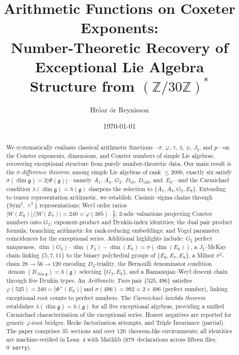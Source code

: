 \documentclass[11pt]{amsart}
\title[Arithmetic Functions on Coxeter Exponents]%
{Arithmetic Functions on Coxeter Exponents:\\
Number-Theoretic Recovery of Exceptional Lie Algebra\\
Structure from $(\mathbb{Z}/30\mathbb{Z})^*$}
\author{Hr\'{o}ar \TH\'{o}r Reynisson}
\date{\today}
\theoremstyle{plain}
\theoremstyle{definition}
\theoremstyle{remark}
\newcommand{\fg}{\mathfrak{g}}
\renewcommand{\Phi}{\varPhi}
\newcommand{\denom}{\operatorname{denom}}
\begin{document}
\begin{abstract}
We systematically evaluate classical arithmetic functions---$\sigma$,
$\varphi$, $\tau$, $\lambda$, $\psi$, $J_2$, and $p$---on the Coxeter
exponents, dimensions, and Coxeter numbers of simple Lie algebras,
recovering exceptional structure from purely number-theoretic data.
Our main result is the \emph{$\sigma$-difference theorem}: among simple
Lie algebras of rank $\le 2000$, exactly six satisfy
$\sigma(\dim\fg) = 2|\Phi(\fg)|$---namely $A_1$, $A_3$, $G_2$, $D_{10}$,
$D_{136}$, and~$E_8$---and the Carmichael condition
$\lambda(\dim\fg) = h(\fg)$ sharpens the selection to $\{A_1,A_3,G_2,E_8\}$.
Extending to tensor representation arithmetic, we establish: Casimir--sigma
chains through $\{\mathrm{Sym}^2,\wedge^2\}$ representations; Weyl order
ratios $|W(E_8)|/|W(E_7)| = 240 = \varphi(385)\cdot\tfrac{3}{2}$; $2$-adic
valuations projecting Coxeter numbers onto $G_2$; exponent-product and
Dynkin-index identities; the dual pair product formula; branching arithmetic
for rank-reducing embeddings; and Vogel parameter coincidences for the
exceptional series.  Additional highlights include: $G_2$ perfect
uniqueness, $\dim(G_2)\cdot\dim(F_4)-\dim(E_8) = \sigma(\dim(E_8))$,
a $J_2$--McKay chain linking $\{5,7,11\}$ to the binary polyhedral groups
of $\{E_6,E_7,E_8\}$, a Milnor $\sigma^2$-chain $28\to56\to120$ encoding
$D_4$-triality, the Bernoulli denominator condition $\denom(B_{\dim\fg})
= h(\fg)$ selecting $\{G_2,E_8\}$, and a Ramanujan--Weyl descent chain
through five Dynkin types.  An \emph{Arithmetic Twin} pair $\{525, 496\}$ satisfies
$\varphi(525) = 240 = |\Phi^+(E_8)|$ and $\sigma(496) = 992 = 2 \times 496$
(perfect number), linking exceptional root counts to perfect numbers.
The \emph{Carmichael--lambda theorem} establishes
$\lambda(\dim\fg) = h(\fg)$ for all five exceptional algebras, providing
a unified Carmichael characterisation of the exceptional series.
Honest negatives are reported for generic
$\varphi$-root bridges, Hecke factorization attempts, and Triple
Invariance (partial).  The paper comprises $35$~sections and
over $120$~theorem-like environments; all identities are
machine-verified in Lean~4 with Mathlib
(679~declarations across fifteen files, 0~\texttt{sorry}).
\end{abstract}

\maketitle

\end{document}

